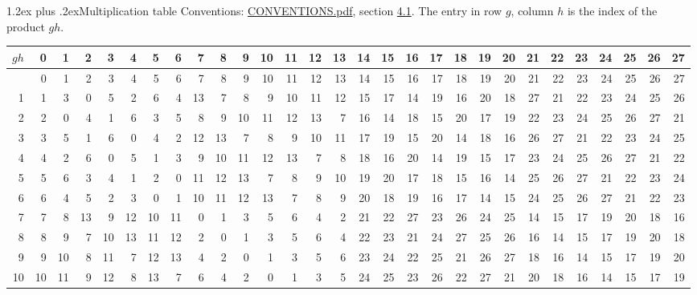 \documentclass[10pt,a4paper]{article}
\makeatletter
\renewcommand\section{\@startsection{section}{1}{\z@}{-3ex plus -1ex minus -.2ex}%
  {1.2ex plus .2ex}{\normalfont\large\sffamily\bfseries\color{parttitle}}}
\numberwithin{equation}{section}
\makeatother
\begin{document}
\section{Multiplication table}\label{s:multiplication}
Conventions: \href{../../CONVENTIONS.pdf}{CONVENTIONS.pdf}, section \href{../../CONVENTIONS.pdf\#conv.4.1}{4.1}.
The entry in row $g$, column $h$ is the index of the product $gh$.
{\normalsize\setlength{\tabcolsep}{0.1em}\setlength{\LTleft}{-8pt plus 1fill}\setlength{\LTright}{-8pt plus 1fill}\begin{longtable}{@{}r|rrrrrrrrrrrrrrrrrrrrrrrrrrrr@{}}\toprule
$gh$ & 0 & 1 & 2 & 3 & 4 & 5 & 6 & 7 & 8 & 9 & 10 & 11 & 12 & 13 & 14 & 15 & 16 & 17 & 18 & 19 & 20 & 21 & 22 & 23 & 24 & 25 & 26 & 27\\\midrule\endhead
\bottomrule\endfoot\endlastfoot
0 & 0 & 1 & 2 & 3 & 4 & 5 & 6 & 7 & 8 & 9 & 10 & 11 & 12 & 13 & 14 & 15 & 16 & 17 & 18 & 19 & 20 & 21 & 22 & 23 & 24 & 25 & 26 & 27\\*
1 & 1 & 3 & 0 & 5 & 2 & 6 & 4 & 13 & 7 & 8 & 9 & 10 & 11 & 12 & 15 & 17 & 14 & 19 & 16 & 20 & 18 & 27 & 21 & 22 & 23 & 24 & 25 & 26\\
2 & 2 & 0 & 4 & 1 & 6 & 3 & 5 & 8 & 9 & 10 & 11 & 12 & 13 & 7 & 16 & 14 & 18 & 15 & 20 & 17 & 19 & 22 & 23 & 24 & 25 & 26 & 27 & 21\\
3 & 3 & 5 & 1 & 6 & 0 & 4 & 2 & 12 & 13 & 7 & 8 & 9 & 10 & 11 & 17 & 19 & 15 & 20 & 14 & 18 & 16 & 26 & 27 & 21 & 22 & 23 & 24 & 25\\
4 & 4 & 2 & 6 & 0 & 5 & 1 & 3 & 9 & 10 & 11 & 12 & 13 & 7 & 8 & 18 & 16 & 20 & 14 & 19 & 15 & 17 & 23 & 24 & 25 & 26 & 27 & 21 & 22\\
5 & 5 & 6 & 3 & 4 & 1 & 2 & 0 & 11 & 12 & 13 & 7 & 8 & 9 & 10 & 19 & 20 & 17 & 18 & 15 & 16 & 14 & 25 & 26 & 27 & 21 & 22 & 23 & 24\\
6 & 6 & 4 & 5 & 2 & 3 & 0 & 1 & 10 & 11 & 12 & 13 & 7 & 8 & 9 & 20 & 18 & 19 & 16 & 17 & 14 & 15 & 24 & 25 & 26 & 27 & 21 & 22 & 23\\
7 & 7 & 8 & 13 & 9 & 12 & 10 & 11 & 0 & 1 & 3 & 5 & 6 & 4 & 2 & 21 & 22 & 27 & 23 & 26 & 24 & 25 & 14 & 15 & 17 & 19 & 20 & 18 & 16\\
8 & 8 & 9 & 7 & 10 & 13 & 11 & 12 & 2 & 0 & 1 & 3 & 5 & 6 & 4 & 22 & 23 & 21 & 24 & 27 & 25 & 26 & 16 & 14 & 15 & 17 & 19 & 20 & 18\\
9 & 9 & 10 & 8 & 11 & 7 & 12 & 13 & 4 & 2 & 0 & 1 & 3 & 5 & 6 & 23 & 24 & 22 & 25 & 21 & 26 & 27 & 18 & 16 & 14 & 15 & 17 & 19 & 20\\
10 & 10 & 11 & 9 & 12 & 8 & 13 & 7 & 6 & 4 & 2 & 0 & 1 & 3 & 5 & 24 & 25 & 23 & 26 & 22 & 27 & 21 & 20 & 18 & 16 & 14 & 15 & 17 & 19\\

\end{longtable}}
\end{document}

